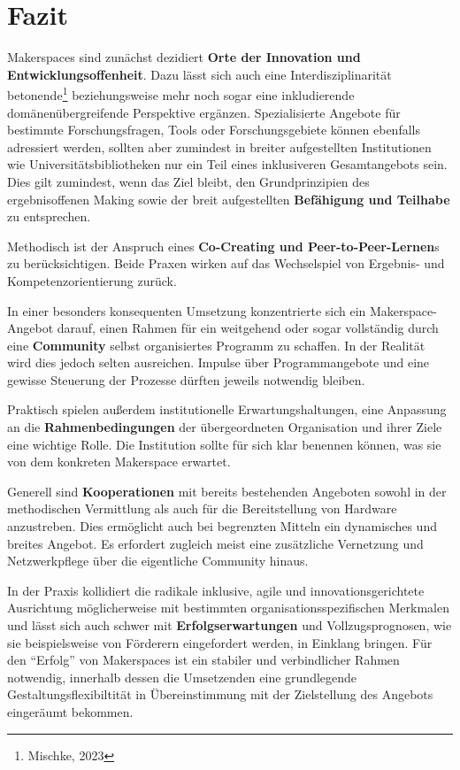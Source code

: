 \documentclass[a4paper,
fontsize=11pt,
oneside,
numbers=noperiodatend,
parskip=half-,
bibliography=totoc,
final
]{scrartcl}
\begin{document}
\hypertarget{fazit}{%
\section{Fazit}\label{fazit}}

Makerspaces sind zunächst dezidiert \textbf{Orte der Innovation und
Entwicklungsoffenheit}. Dazu lässt sich auch eine Interdisziplinarität
betonende\footnote{Mischke, 2023} beziehungsweise mehr noch sogar eine
inkludierende domänenübergreifende Perspektive ergänzen. Spezialisierte
Angebote für bestimmte Forschungsfragen, Tools oder Forschungsgebiete
können ebenfalls adressiert werden, sollten aber zumindest in breiter
aufgestellten Institutionen wie Universitätsbibliotheken nur ein Teil
eines inklusiveren Gesamtangebots sein. Dies gilt zumindest, wenn das
Ziel bleibt, den Grundprinzipien des ergebnisoffenen Making sowie der
breit aufgestellten \textbf{Befähigung und Teilhabe} zu entsprechen.

Methodisch ist der Anspruch eines \textbf{Co-Creating und
Peer-to-Peer-Lernen}s zu berücksichtigen. Beide Praxen wirken auf das
Wechselspiel von Ergebnis- und Kompetenzorientierung zurück.

In einer besonders konsequenten Umsetzung konzentrierte sich ein
Makerspace-Angebot darauf, einen Rahmen für ein weitgehend oder sogar
vollständig durch eine \textbf{Community} selbst organisiertes Programm
zu schaffen. In der Realität wird dies jedoch selten ausreichen. Impulse
über Programmangebote und eine gewisse Steuerung der Prozesse dürften
jeweils notwendig bleiben.

Praktisch spielen außerdem institutionelle Erwartungshaltungen, eine
Anpassung an die \textbf{Rahmenbedingungen} der übergeordneten
Organisation und ihrer Ziele eine wichtige Rolle. Die Institution sollte
für sich klar benennen können, was sie von dem konkreten Makerspace
erwartet.

Generell sind \textbf{Kooperationen} mit bereits bestehenden Angeboten
sowohl in der methodischen Vermittlung als auch für die Bereitstellung
von Hardware anzustreben. Dies ermöglicht auch bei begrenzten Mitteln
ein dynamisches und breites Angebot. Es erfordert zugleich meist eine
zusätzliche Vernetzung und Netzwerkpflege über die eigentliche Community
hinaus.

In der Praxis kollidiert die radikale inklusive, agile und
innovationsgerichtete Ausrichtung möglicherweise mit bestimmten
organisationsspezifischen Merkmalen und lässt sich auch schwer mit
\textbf{Erfolgserwartungen} und Vollzugsprognosen, wie sie
beispielsweise von Förderern eingefordert werden, in Einklang bringen.
Für den \enquote{Erfolg} von Makerspaces ist ein stabiler und
verbindlicher Rahmen notwendig, innerhalb dessen die Umsetzenden eine
grundlegende Gestaltungsflexibiltität in Übereinstimmung mit der
Zielstellung des Angebots eingeräumt bekommen.
\end{document}
